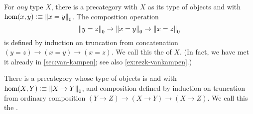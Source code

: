 \documentclass[hott-all.tex]{subfiles}
\begin{document}
\begin{eg}
  For \emph{any} type $X$, there is a precategory with $X$ as its type of objects and with $\hom(x,y) \vcentcolon\equiv \mathopen{}\left\Vert x=y\right\Vert_{0}\mathclose{}$.
  The composition operation
  \[ \mathopen{}\left\Vert y=z\right\Vert_{0}\mathclose{} \to \mathopen{}\left\Vert x=y\right\Vert_{0}\mathclose{} \to \mathopen{}\left\Vert x=z\right\Vert_{0}\mathclose{} \]
  is defined by induction on truncation from concatenation $(y=z)\to(x=y)\to(x=z)$.
  We call this the 
  of $X$.
  (In fact, we have met it already in \cref{sec:van-kampen}; see also \cref{ex:rezk-vankampen}.)
\end{eg}

\begin{eg}
  There is a precategory whose type of objects is \type and with $\hom(X,Y) \vcentcolon\equiv \mathopen{}\left\Vert X\to Y\right\Vert_{0}\mathclose{}$, and composition defined by induction on truncation from ordinary composition $(Y\to Z) \to (X\to Y) \to (X\to Z)$.
  We call this the .
\end{eg}
\end{document}
